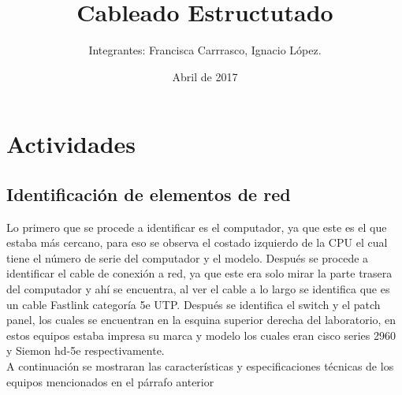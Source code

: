 \documentclass{udpreport}
\title{Cableado Estructutado}
\author{Integrantes: Francisca Carrrasco, Ignacio López.}
\date{Abril de 2017}
\begin{document}
\maketitle
\tableofcontents
\chapter{Actividades}
	\section{Identificación de elementos de red}
		Lo primero que se procede a identificar es el computador, ya que este es el que estaba más cercano, para eso se observa  		el costado izquierdo de la CPU el cual tiene el número de serie del computador y el modelo. Después se procede a identificar 		el cable de conexión a red,  ya que este era solo mirar la parte trasera del computador y ahí se encuentra, al ver el cable 		a lo largo se identifica que es un cable Fastlink categoría 5e UTP. Después se identifica el switch y el patch panel, los 		cuales se encuentran en la esquina superior derecha del laboratorio, en estos equipos estaba impresa su marca y modelo 		los cuales eran cisco series 2960 y Siemon hd-5e respectivamente.\\
		A continuación se mostraran las características y especificaciones técnicas de los equipos mencionados en el párrafo 			anterior\\
\end{document}
